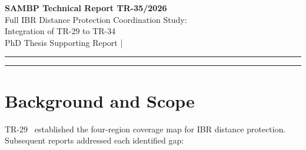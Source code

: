 \documentclass[11pt,a4paper]{article}
\begin{document}
\begin{center}
  {\LARGE\bfseries\color{sambpblue}
    SAMBP Technical Report TR-35/2026}\\[6pt]
  {\large Full IBR Distance Protection Coordination Study:\\
    Integration of TR-29 to TR-34}\\[10pt]
  {\normalsize PhD Thesis Supporting Report \quad|}
\end{center}

\vspace{2pt}\hrule\vspace{8pt}

\begin{abstract}
\noindent
This report integrates the individual protection elements developed in
TR-29--TR-34 into a unified, quantitatively verified protection scheme for
inverter-based resource (IBR) lines.  A Python simulation framework evaluates
five protection functions---Zone~1 quadrilateral, 87L differential, 67N/67Q
directional overcurrent, Zone~2/POTT, and TDCS backup---across 48 sampled
($\alpha$, $k_\mathrm{ibr}$) operating points, nine fault scenario types, and
three external-fault selectivity cases.  Key results: (A)~zero coverage gaps for
metallic three-phase faults across all TR-29 regions; (B)~67N provides
$k_\mathrm{ibr}$-independent SLG coverage; (C)~all three external-fault cases
correctly block; (D)~the transition from 87L-only to dual (Z1 + 87L) coverage
occurs at $k_\mathrm{ibr}=0.10$; (E)~the five-element time ladder ensures
complete, selective fault clearance within the 100\,ms memory window.  The sole
structural limit---no protection function below $k_\mathrm{ibr}=0.06$---is
inherent to IBR physics, not a scheme deficiency.
\end{abstract}

\vspace{4pt}\hrule\vspace{10pt}

\section{Background and Scope}
\label{sec:background}

TR-29~\cite{SAMBP_TR29} established the four-region coverage map for IBR
distance protection.  Subsequent reports addressed each identified gap:
\end{document}
